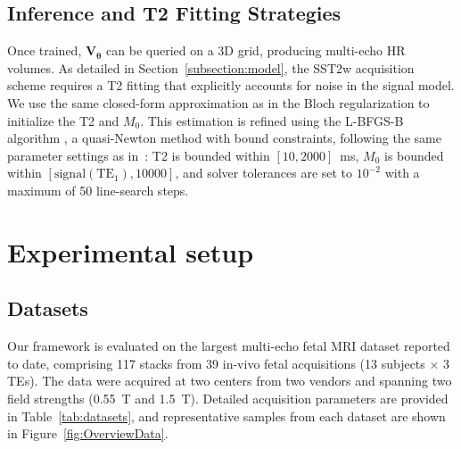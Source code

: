 \documentclass[preprint,authoryear,12pt]{elsarticle}
\begin{document}
\subsection{Inference and T2 Fitting Strategies}
\label{sec:t2}
Once trained, $\mathbf{V_\theta}$ can be queried on a 3D grid, producing multi-echo HR volumes. As detailed in Section~\ref{subsection:model}, the SST2w acquisition scheme requires a T2 fitting that explicitly accounts for noise in the signal model. We use the same closed-form approximation as in the Bloch regularization to initialize the T2 and $M_0$. This estimation is refined using the L-BFGS-B algorithm \citep{byrd_limited_1995}, a quasi-Newton method with bound constraints, following the same parameter settings as in~\cite{roulet_t2_2025}: T2 is bounded within $[10, 2000]$~ms, $M_0$ is bounded within $[\mathrm{signal}(\mathrm{TE}_{1}), 10000]$, and solver tolerances are set to $10^{-2}$ with a maximum of 50 line-search steps.

\section{Experimental setup}
\subsection{Datasets}
Our framework is evaluated on the largest multi-echo fetal MRI dataset reported to date, comprising 117 stacks from 39 in-vivo fetal acquisitions (13 subjects $\times$ 3 TEs). The data were acquired at two centers from two vendors and spanning two field strengths (0.55~T and 1.5~T). Detailed acquisition parameters are provided in Table~\ref{tab:datasets}, and representative samples from each dataset are shown in Figure~\ref{fig:OverviewData}.
\end{document}
